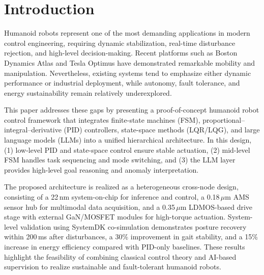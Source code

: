 \section{Introduction}
Humanoid robots represent one of the most demanding applications in modern control engineering,
requiring dynamic stabilization, real-time disturbance rejection, and high-level
decision-making. Recent platforms such as Boston Dynamics Atlas and Tesla Optimus
have demonstrated remarkable mobility and manipulation. Nevertheless, existing systems
tend to emphasize either dynamic performance or industrial deployment, while
autonomy, fault tolerance, and energy sustainability remain relatively underexplored.

This paper addresses these gaps by presenting a proof-of-concept humanoid robot control
framework that integrates finite-state machines (FSM), proportional–integral–derivative (PID)
controllers, state-space methods (LQR/LQG), and large language models (LLMs)
into a unified hierarchical architecture. In this design,
(1) low-level PID and state-space control ensure stable actuation,
(2) mid-level FSM handles task sequencing and mode switching,
and (3) the LLM layer provides high-level goal reasoning and anomaly interpretation.

The proposed architecture is realized as a heterogeneous cross-node design,
consisting of a 22\,nm system-on-chip for inference and control, a 0.18\,$\mu$m
AMS sensor hub for multimodal data acquisition, and a 0.35\,$\mu$m LDMOS-based
drive stage with external GaN/MOSFET modules for high-torque actuation.
System-level validation using SystemDK co-simulation demonstrates posture
recovery within 200\,ms after disturbances, a 30\% improvement in gait stability,
and a 15\% increase in energy efficiency compared with PID-only baselines.
These results highlight the feasibility of combining classical control theory
and AI-based supervision to realize sustainable and fault-tolerant humanoid robots.
